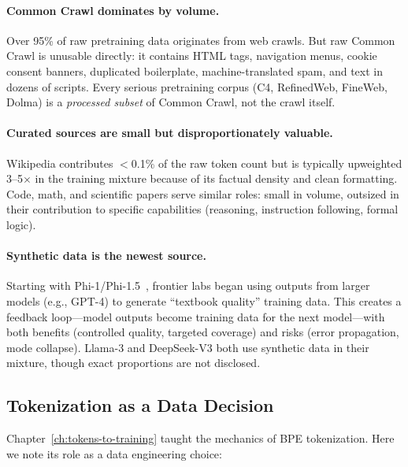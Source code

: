 \paragraph{Common Crawl dominates by volume.} Over 95\% of raw pretraining data originates from web crawls. But raw Common Crawl is unusable directly: it contains HTML tags, navigation menus, cookie consent banners, duplicated boilerplate, machine-translated spam, and text in dozens of scripts. Every serious pretraining corpus (C4, RefinedWeb, FineWeb, Dolma) is a \emph{processed subset} of Common Crawl, not the crawl itself.

\paragraph{Curated sources are small but disproportionately valuable.} Wikipedia contributes $<$0.1\% of the raw token count but is typically upweighted 3--5$\times$ in the training mixture because of its factual density and clean formatting. Code, math, and scientific papers serve similar roles: small in volume, outsized in their contribution to specific capabilities (reasoning, instruction following, formal logic).

\paragraph{Synthetic data is the newest source.} Starting with Phi-1/Phi-1.5~\cite{gunasekar2023phi}, frontier labs began using outputs from larger models (e.g., GPT-4) to generate ``textbook quality'' training data. This creates a feedback loop---model outputs become training data for the next model---with both benefits (controlled quality, targeted coverage) and risks (error propagation, mode collapse). Llama-3 and DeepSeek-V3 both use synthetic data in their mixture, though exact proportions are not disclosed.

\subsection{Tokenization as a Data Decision}

Chapter~\ref{ch:tokens-to-training} taught the mechanics of BPE tokenization. Here we note its role as a data engineering choice:

